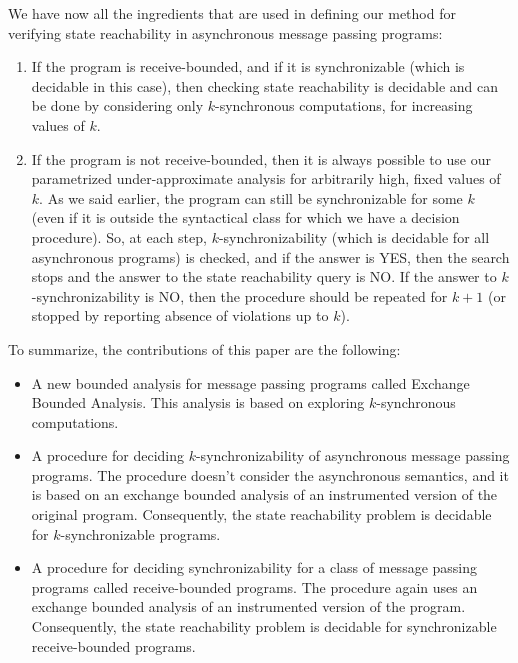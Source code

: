We have now all the ingredients that are used in defining our method for verifying state reachability in asynchronous message passing programs: 
\begin{enumerate}
\item
If the program is receive-bounded, and if it is synchronizable (which is decidable in this case), then checking state reachability is decidable and can be done by considering only $k$-synchronous computations, for increasing values of $k$. 
\item 
If the program is not receive-bounded, then it is always possible to use our parametrized under-approximate analysis for arbitrarily high, fixed values of $k$. As we said earlier, the program can still be synchronizable for some $k$ (even if it is outside the syntactical class for which we have a decision procedure). So, at each step, $k$-synchronizability (which is decidable for all asynchronous programs) is checked, and if the answer is YES, then the search stops and the answer to the state reachability query is NO. If the answer to $k$-synchronizability is NO, then the procedure should be repeated for $k+1$ (or stopped by reporting absence of violations up to $k$).  
\end{enumerate}

To summarize, the contributions of this paper are the following:

\begin{itemize}
\item A new bounded analysis for message passing programs called Exchange Bounded Analysis. This analysis is based on exploring $k$-synchronous computations. 

\item A procedure for deciding $k$-synchronizability of asynchronous message passing programs. The procedure doesn't consider the asynchronous semantics, and it is based on an exchange bounded analysis of an instrumented version of the original program. Consequently, the state reachability problem is decidable for $k$-synchronizable programs. 

\item A procedure for deciding synchronizability for a class of message passing programs called receive-bounded programs. The procedure again uses an exchange bounded analysis of an instrumented version of the program. Consequently, the state reachability problem is decidable for synchronizable receive-bounded programs. 

\end{itemize}
